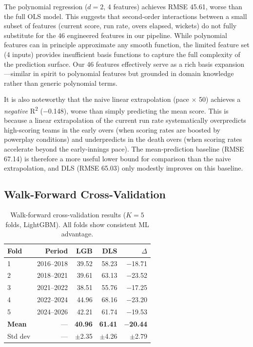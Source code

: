 \documentclass[10pt,a4paper,twocolumn]{article}
\begin{document}
The polynomial regression ($d=2$, 4 features) achieves RMSE 45.61, worse than the full OLS model. This suggests that second-order interactions between a small subset of features (current score, run rate, overs elapsed, wickets) do not fully substitute for the 46 engineered features in our pipeline. While polynomial features can in principle approximate any smooth function, the limited feature set (4 inputs) provides insufficient basis functions to capture the full complexity of the prediction surface. Our 46 features effectively serve as a rich basis expansion---similar in spirit to polynomial features but grounded in domain knowledge rather than generic polynomial terms.

It is also noteworthy that the naive linear extrapolation (pace $\times$ 50) achieves a \emph{negative} R\textsuperscript{2} ($-$0.148), worse than simply predicting the mean score. This is because a linear extrapolation of the current run rate systematically overpredicts high-scoring teams in the early overs (when scoring rates are boosted by powerplay conditions) and underpredicts in the death overs (when scoring rates accelerate beyond the early-innings pace). The mean-prediction baseline (RMSE 67.14) is therefore a more useful lower bound for comparison than the naive extrapolation, and DLS (RMSE 65.03) only modestly improves on this baseline.

\subsection{Walk-Forward Cross-Validation}
\label{sec:wfcv}

\begin{table}[H]
\centering
\caption{Walk-forward cross-validation results ($K=5$ folds, LightGBM). All folds show consistent ML advantage.}
\label{tab:wfcv}
\small
\begin{tabular}{@{}lrrrr@{}}
\toprule
\textbf{Fold} & \textbf{Period} & \textbf{LGB} & \textbf{DLS} & \textbf{$\Delta$} \\
\midrule
1 & 2016--2018 & 39.52 & 58.23 & $-$18.71 \\
2 & 2018--2021 & 39.61 & 63.13 & $-$23.52 \\
3 & 2021--2022 & 38.51 & 55.76 & $-$17.25 \\
4 & 2022--2024 & 44.96 & 68.16 & $-$23.20 \\
5 & 2024--2026 & 42.21 & 61.74 & $-$19.53 \\
\midrule
\textbf{Mean} & --- & \textbf{40.96} & \textbf{61.41} & \textbf{$-$20.44} \\
Std dev       & --- & $\pm$2.35 & $\pm$4.26 & $\pm$2.79 \\
\bottomrule
\end{tabular}
\end{table}
\end{document}
